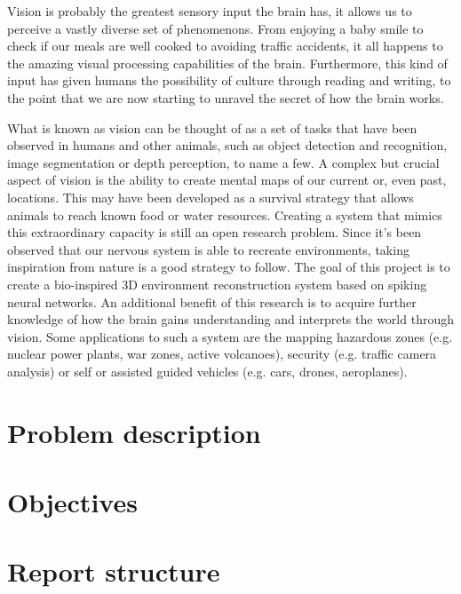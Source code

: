 Vision is probably the greatest sensory input the brain has, it allows us to perceive a vastly diverse set of phenomenons. From enjoying a baby smile to check if our meals are well cooked to avoiding traffic accidents, it all happens to the amazing visual processing capabilities of the brain. Furthermore, this kind of input has given humans the possibility of culture through reading and writing, to the point that we are now starting to unravel the secret of how the brain works.

What is known as vision can be thought of as a set of tasks that have been observed in humans and other animals, such as object detection and recognition, image segmentation or depth perception, to name a few. A complex but crucial aspect of vision is the ability to create mental maps of our current or, even past, locations. This may have been developed as a survival strategy that allows animals to reach known food or water resources. Creating a system that mimics this extraordinary capacity is still an open research problem. Since it's been observed that our nervous system is able to recreate environments, taking inspiration from nature is a good strategy to follow. The goal of this project is to create a bio-inspired 3D environment reconstruction system based on spiking neural networks. An additional benefit of this research is to acquire further knowledge of how the brain gains understanding and interprets the world through vision. Some applications to such a system are the mapping hazardous zones (e.g. nuclear power plants, war zones, active volcanoes), security (e.g. traffic camera analysis) or self or assisted guided vehicles (e.g. cars, drones, aeroplanes).

\section{Problem description}
\label{sec:intro:problem}


\section{Objectives}
\label{sec:intro:objectives}

%

\section{Report structure}
\label{sec:intro:structure}
